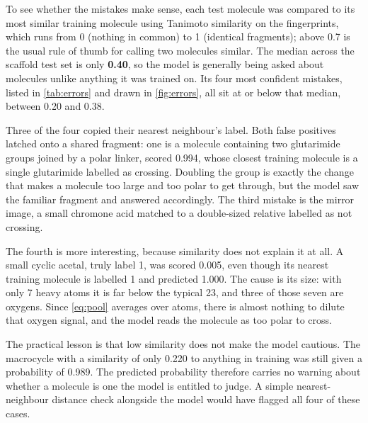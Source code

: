 To see whether the mistakes make sense, each test molecule was compared to its most similar training molecule using Tanimoto similarity on the fingerprints, which runs from 0 (nothing in common) to 1 (identical fragments); above 0.7 is the usual rule of thumb for calling two molecules similar. The median across the scaffold test set is only \textbf{0.40}, so the model is generally being asked about molecules unlike anything it was trained on. Its four most confident mistakes, listed in \cref{tab:errors} and drawn in \cref{fig:errors}, all sit at or below that median, between 0.20 and 0.38.

Three of the four copied their nearest neighbour's label. Both false positives latched onto a shared fragment: one is a molecule containing two glutarimide groups joined by a polar linker, scored 0.994, whose closest training molecule is a single glutarimide labelled as crossing. Doubling the group is exactly the change that makes a molecule too large and too polar to get through, but the model saw the familiar fragment and answered accordingly. The third mistake is the mirror image, a small chromone acid matched to a double-sized relative labelled as not crossing.

The fourth is more interesting, because similarity does not explain it at all. A small cyclic acetal, truly label 1, was scored 0.005, even though its nearest training molecule is labelled 1 and predicted 1.000. The cause is its size: with only 7 heavy atoms it is far below the typical 23, and three of those seven are oxygens. Since \cref{eq:pool} averages over atoms, there is almost nothing to dilute that oxygen signal, and the model reads the molecule as too polar to cross.

The practical lesson is that low similarity does not make the model cautious. The macrocycle with a similarity of only 0.220 to anything in training was still given a probability of 0.989. The predicted probability therefore carries no warning about whether a molecule is one the model is entitled to judge. A simple nearest-neighbour distance check alongside the model would have flagged all four of these cases.
